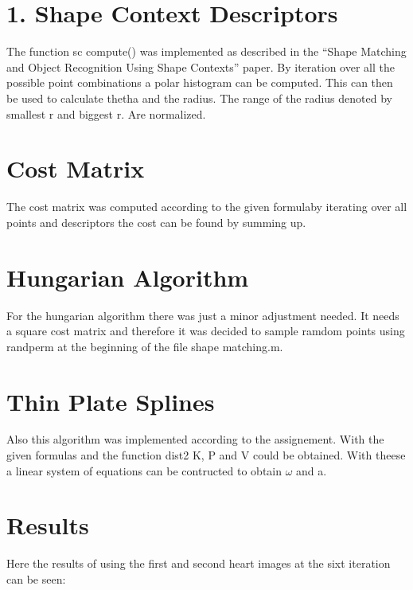 \documentclass[12pt]{article}
\begin{document}
\maketitle


\section{1.  Shape Context Descriptors  }

The function sc compute() was implemented as described in the “Shape Matching and Object Recognition Using Shape Contexts” paper. By iteration over all the possible point combinations a polar histogram can be computed. This can then be used to calculate thetha and the radius. The range of the radius denoted by smallest r and biggest r. Are normalized.

\section{ Cost Matrix }

The cost matrix was computed according to the given formulaby iterating over all points and descriptors the cost can be found by summing up. 

\section{Hungarian Algorithm }

For the hungarian algorithm there was just a minor adjustment needed. It needs a square cost matrix and therefore it was decided to sample ramdom points using randperm at the beginning of the file shape matching.m.

\section{Thin Plate Splines }
Also this algorithm was implemented according to the assignement. With the given formulas and the function dist2 K, P and V could be obtained. With theese a linear system of equations can be contructed to obtain $\omega$ and a.

\section{Results }
Here the results of using the first and second heart images at the sixt iteration can be seen:
\end{document}
